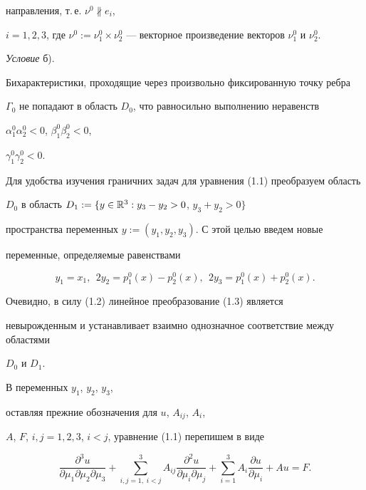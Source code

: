 направления, т.\,е. $\nu^0 \nparallel e_i$,


$i=1,2,3$, где $\nu^0:=\nu_1^0


\times \nu_2^0$ --- векторное произведение векторов $\nu_1^0 $ и $\nu_2^0 $.





{\it Условие} б). 


Бихарактеристики, проходящие через произвольно фиксированную точку ребра


$\Gamma_0$ не попадают в область $D_0$, что равносильно выполнению неравенств


$\alpha_1^0\alpha_2^0<0$, $\beta_1^0\beta_2^0<0$,


$\gamma_1^0\gamma_2^0<0$.





Для удобства изучения граничних задач для уравнения (1.1) преобразуем область


$D_0$ в область $D_1:=\{y \in \Bbb{R}^3:y_3-y_2>0$, $y_3+y_2>0\}$


пространства переменных $y:=(y_1,y_2,y_3)$. С этой целью введем новые


переменные, определяемые равенствами




\begin{equation}


y_1=x_1,\ \ 2y_2=p_1^0(x)-p_2^0(x),\ \ 2y_3=p_1^0(x)+p_2^0(x).


\end{equation}


Очевидно, в силу (1.2) линейное преобразование (1.3) является


невырожденным и устанавливает взаимно однозначное соответствие между областями


$D_0$ и $D_1$.





В переменных $y_1$, $y_2$, $y_3$,


оставляя прежние обозначения для $u$, $A_{ij}$, $A_i$,


$A$, $F$, $i,j=1,2,3$, $i<j$, уравнение (1.1) перепишем в виде




\begin{equation}


\frac{\partial^{3}u}{\partial \mu_1 \partial \mu_2 \partial \mu_3}+


\sum_{i,j=1,\;i<j}^{3}A_{ij} \frac{\partial^{2}u}{\partial \mu_i \partial


\mu_j}+\sum_{i=1}^{3} A_i \frac{\partial u}{\partial \mu_i}+Au=F.


\end{equation}


